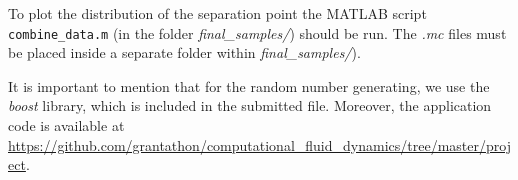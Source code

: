 \documentclass[12pt,a4paper]{article}
\begin{document}
\par To plot the distribution of the separation point the MATLAB script \texttt{combine\_data.m} (in the folder \emph{final\_samples/}) should be run. The \emph{\*.mc} files must be placed inside a separate folder within \emph{final\_samples/}).

It is important to mention that for the random number generating, we use the \emph{boost} library, which is included in the submitted file. Moreover, the application code is available at \url{https://github.com/grantathon/computational_fluid_dynamics/tree/master/project}.
\end{document}
